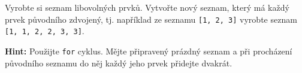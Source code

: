 \question[50]
Vyrobte si seznam libovolných prvků. Vytvořte nový seznam, který má každý prvek
původního zdvojený, tj. například ze seznamu \texttt{[1, 2, 3]} vyrobte seznam
\texttt{[1, 1, 2, 2, 3, 3]}.

\textbf{Hint:} Použijte \texttt{for} cyklus. Mějte připravený prázdný seznam a
při procházení původního seznamu do něj každý jeho prvek přidejte dvakrát.